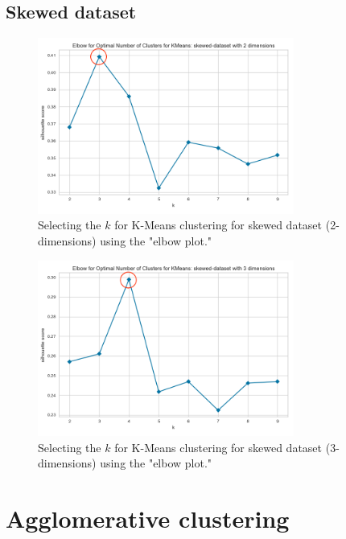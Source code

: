 \subsection{Skewed dataset}
\begin{figure}[H]
  \includegraphics[width=0.75\textwidth]{Appendix//parameter-selection/skewed-dataset-2-kmeans.png}
  \caption{Selecting the $k$ for K-Means clustering for skewed dataset (2-dimensions) using the "elbow plot."}
  \label{hyperparameters:agglomerative-skewed-dataset-2d}
\end{figure}
\begin{figure}[H]
  \includegraphics[width=0.75\textwidth]{Appendix//parameter-selection/skewed-dataset-3-kmeans.png}
  \caption{Selecting the $k$ for K-Means clustering for skewed dataset (3-dimensions) using the "elbow plot."}
  \label{hyperparameters:agglomerative-skewed-dataset-3d}
\end{figure}
\newpage
\section{Agglomerative clustering} \label{appendix:agglomerative-hyperparameters}

